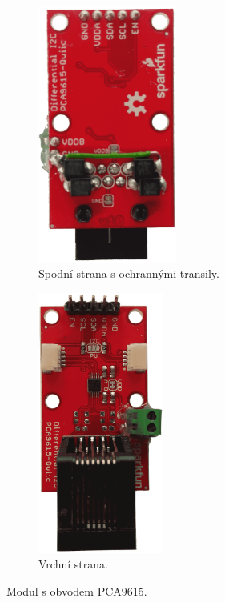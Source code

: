 \begin{figure}[H]
\centering
\begin{subfigure}{.5\textwidth}
    \centering
    \includegraphics[width=0.5\textwidth]{images/krb/modul-pca9615-transily.png}
    \caption{Spodní strana s ochrannými transily.}
    \label{fig:modul-pca9615-transily}
\end{subfigure}%
\begin{subfigure}{.5\textwidth}
    \centering
    \includegraphics[width=0.45\textwidth]{images/krb/modul-pca9615-i2c-sbernice.png}
    \caption{Vrchní strana.}
    \label{fig:modul-pca9615-i2c-sbernice}
\end{subfigure}
\caption{Modul s obvodem PCA9615.}
\label{fig:modul-pca9615}
\end{figure}